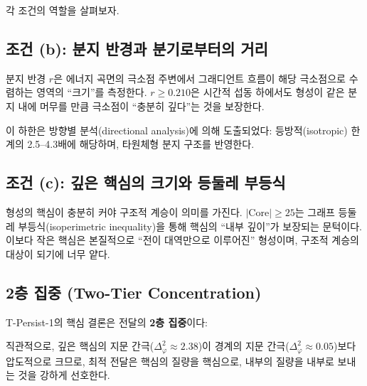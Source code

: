 각 조건의 역할을 살펴보자.

\subsection{조건 (b): 분지 반경과 분기로부터의 거리}

분지 반경 $r$은 에너지 곡면의 극소점 주변에서 그래디언트 흐름이 해당 극소점으로 수렴하는 영역의 ``크기''를 측정한다. $r \geq 0.210$은 시간적 섭동 하에서도 형성이 같은 분지 내에 머무를 만큼 극소점이 ``충분히 깊다''는 것을 보장한다.

이 하한은 방향별 분석(directional analysis)에 의해 도출되었다: 등방적(isotropic) 한계의 2.5--4.3배에 해당하며, 타원체형 분지 구조를 반영한다.

\subsection{조건 (c): 깊은 핵심의 크기와 등둘레 부등식}

형성의 핵심이 충분히 커야 구조적 계승이 의미를 가진다. $|\mathrm{Core}| \geq 25$는 그래프 등둘레 부등식(isoperimetric inequality)을 통해 핵심의 ``내부 깊이''가 보장되는 문턱이다. 이보다 작은 핵심은 본질적으로 ``전이 대역만으로 이루어진'' 형성이며, 구조적 계승의 대상이 되기에 너무 얕다.

\subsection{2층 집중 (Two-Tier Concentration)}

T-Persist-1의 핵심 결론은 전달의 \textbf{2층 집중}이다:

\begin{center}
\end{center}

직관적으로, 깊은 핵심의 지문 간극($\Delta_\varphi^2 \approx 2.38$)이 경계의 지문 간극($\Delta_\varphi^2 \approx 0.05$)보다 압도적으로 크므로, 최적 전달은 핵심의 질량을 핵심으로, 내부의 질량을 내부로 보내는 것을 강하게 선호한다.

